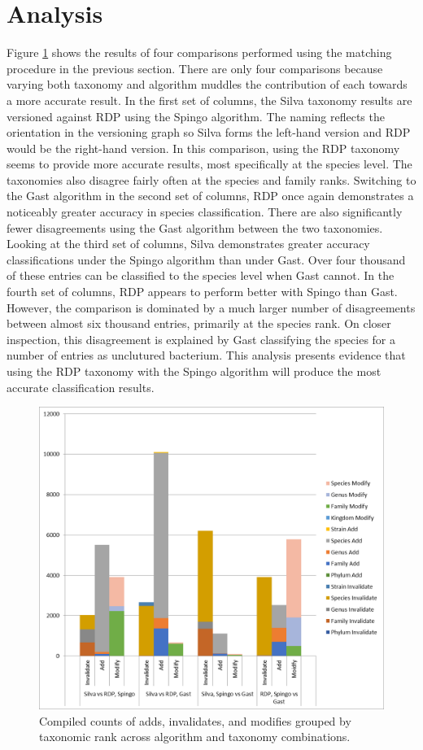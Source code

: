 \section{Analysis}

Figure \ref{mbvl_chart} shows the results of four comparisons performed using the matching procedure in the previous section.
There are only four comparisons because varying both taxonomy and algorithm muddles the contribution of each towards a more accurate result.
In the first set of columns, the Silva taxonomy results are versioned against RDP using the Spingo algorithm.
The naming reflects the orientation in the versioning graph so Silva forms the left-hand version and RDP would be the right-hand version.
In this comparison, using the RDP taxonomy seems to provide more accurate results, most specifically at the species level.
The taxonomies also disagree fairly often at the species and family ranks.
Switching to the Gast algorithm in the second set of columns, RDP once again demonstrates a noticeably greater accuracy in species classification.
There are also significantly fewer disagreements using the Gast algorithm between the two taxonomies.
Looking at the third set of columns, Silva demonstrates greater accuracy classifications under the Spingo algorithm than under Gast.
Over four thousand of these entries can be classified to the species level when Gast cannot.
In the fourth set of columns, RDP appears to perform better with Spingo than Gast.
However, the comparison is dominated by a much larger number of disagreements between almost six thousand entries, primarily at the species rank.
On closer inspection, this disagreement is explained by Gast classifying the species for a number of entries as unclutured bacterium.
This analysis presents evidence that using the RDP taxonomy with the Spingo algorithm will produce the most accurate classification results.

\begin{figure}
	\centering
	\includegraphics[scale=0.80]{figures/mbvl_chart.png}
	\caption{Compiled counts of adds, invalidates, and modifies grouped by taxonomic rank across algorithm and taxonomy combinations.}
	\label{mbvl_chart}
\end{figure}